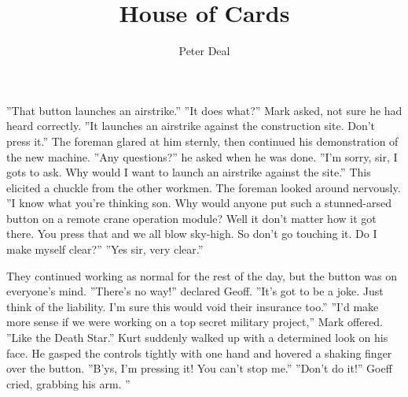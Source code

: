 \documentclass{book}
\title{House of Cards}
\author{Peter Deal}
\begin{document}
''That button launches an airstrike.''
''It does what?'' Mark asked, not sure he had heard correctly.
''It launches an airstrike against the construction site. Don't press it.'' The foreman glared at him sternly, then continued his demonstration of the new machine.
''Any questions?'' he asked when he was done.
''I'm sorry, sir, I gots to ask. Why would I want to launch an airstrike against the site.'' This elicited a chuckle from the other workmen.
The foreman looked around nervously. ''I know what you're thinking son. Why would anyone put such a stunned-arsed button on a remote crane operation module? Well it don't matter how it got there. You press that and we all blow sky-high. So don't go touching it. Do I make myself clear?''
''Yes sir, very clear.''

They continued working as normal for the rest of the day, but the button was on everyone's mind.
''There's no way!'' declared Geoff. ''It's got to be a joke. Just think of the liability. I'm sure this would void their insurance too.''
''I'd make more sense if we were working on a top secret military project,'' Mark offered. ''Like the Death Star.''
Kurt suddenly walked up with a determined look on his face. He gasped the controls tightly with one hand and hovered a shaking finger over the button. ''B'ys, I'm pressing it! You can't stop me.''
''Don't do it!'' Goeff cried, grabbing his arm. ''
\end{document}
